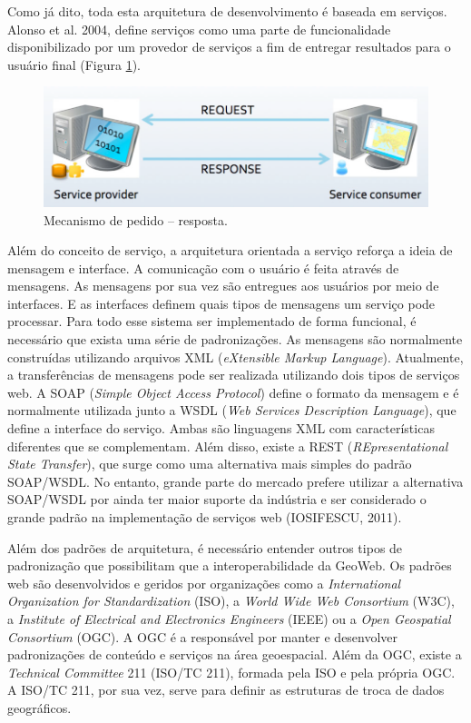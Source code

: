 		Como já dito, toda esta arquitetura de desenvolvimento é baseada em serviços. Alonso et al. 2004, define serviços como uma parte de funcionalidade disponibilizado por um provedor de serviços a fim de entregar resultados para o usuário final (Figura \ref{fig:pedido-resposta}).
		
		\begin{figure}
			\centering
			\includegraphics[width=1\linewidth]{data/pedido-resposta}
			\caption{Mecanismo de pedido – resposta. \cite{IOSIFESCU_11}}
			\label{fig:pedido-resposta}
		\end{figure}
		
		Além do conceito de serviço, a arquitetura orientada a serviço reforça a ideia de mensagem e interface. A comunicação com o usuário é feita através de mensagens. As mensagens por sua vez são entregues aos usuários por meio de interfaces. E as interfaces definem quais tipos de mensagens um serviço pode processar. Para todo esse sistema ser implementado de forma funcional, é necessário que exista uma série de padronizações. As mensagens são normalmente construídas utilizando arquivos XML (\textit{eXtensible Markup Language}). Atualmente, a transferências de mensagens pode ser realizada utilizando dois tipos de serviços web. A SOAP (\textit{Simple Object Access Protocol}) define o formato da mensagem e é normalmente utilizada junto a WSDL (\textit{Web Services Description Language}), que define a interface do serviço.  Ambas são linguagens XML com características diferentes que se complementam. Além disso, existe a REST (\textit{REpresentational State Transfer}), que surge como uma alternativa mais simples do padrão SOAP/WSDL. No entanto, grande parte do mercado prefere utilizar a alternativa SOAP/WSDL por ainda ter maior suporte da indústria e ser considerado o grande padrão na implementação de serviços web (IOSIFESCU, 2011)\cite{IOSIFESCU_11}.
		
		Além dos padrões de arquitetura, é necessário entender outros tipos de padronização que possibilitam que a interoperabilidade da GeoWeb. Os padrões web são desenvolvidos e geridos por organizações como a \textit{International Organization for Standardization} (ISO), a \textit{World Wide Web Consortium} (W3C), a \textit{Institute of Electrical and Electronics Engineers} (IEEE) ou a \textit{Open Geospatial Consortium} (OGC). A OGC é a responsável por manter e desenvolver padronizações de conteúdo e serviços na área geoespacial. Além da OGC, existe a \textit{Technical Committee} 211 (ISO/TC 211), formada pela ISO e pela própria OGC. A ISO/TC 211, por sua vez, serve para definir as estruturas de troca de dados geográficos.
		
